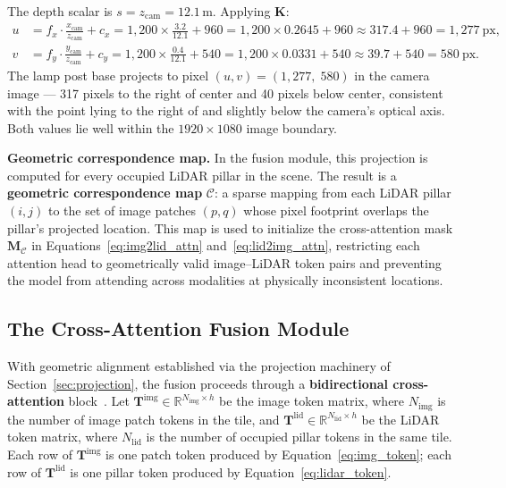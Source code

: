 \documentclass{book}
\begin{document}
The depth scalar is $s = z_{\text{cam}} = 12.1$\,m.  Applying
$\mathbf{K}$:
\begin{align*}
  u &= f_x \cdot \frac{x_{\text{cam}}}{z_{\text{cam}}} + c_x
     = 1{,}200 \times \frac{3.2}{12.1} + 960
     = 1{,}200 \times 0.2645 + 960
     \approx 317.4 + 960
     = 1{,}277\ \text{px}, \\[6pt]
  v &= f_y \cdot \frac{y_{\text{cam}}}{z_{\text{cam}}} + c_y
     = 1{,}200 \times \frac{0.4}{12.1} + 540
     = 1{,}200 \times 0.0331 + 540
     \approx 39.7 + 540
     = 580\ \text{px}.
\end{align*}
The lamp post base projects to pixel $(u, v) = (1{,}277,\; 580)$
in the camera image --- 317 pixels to the right of center and 40
pixels below center, consistent with the point lying to the right
of and slightly below the camera's optical axis.  Both values lie
well within the $1920 \times 1080$ image boundary.

\medskip
\noindent\textbf{Geometric correspondence map.}
In the fusion module, this projection is computed for every occupied
LiDAR pillar in the scene.  The result is a \textbf{geometric
correspondence map} $\mathcal{C}$: a sparse mapping from each LiDAR
pillar $(i,j)$ to the set of image patches $(p,q)$ whose pixel
footprint overlaps the pillar's projected location.  This map is
used to initialize the cross-attention mask $\mathbf{M}_{\mathcal{C}}$
in Equations~\eqref{eq:img2lid_attn} and~\eqref{eq:lid2img_attn},
restricting each attention head to geometrically valid
image--LiDAR token pairs and preventing the model from attending
across modalities at physically inconsistent locations.

 
\subsection{The Cross-Attention Fusion Module}
\label{sec:fusion}

With geometric alignment established via the projection machinery of
Section~\ref{sec:projection}, the fusion proceeds through a
\textbf{bidirectional cross-attention} block~\cite{chen2021crossvit,
li2022bevformer}.  Let
$\mathbf{T}^{\text{img}} \in \mathbb{R}^{N_{\text{img}} \times h}$
be the image token matrix, where $N_{\text{img}}$ is the number of
image patch tokens in the tile, and
$\mathbf{T}^{\text{lid}} \in \mathbb{R}^{N_{\text{lid}} \times h}$
be the LiDAR token matrix, where $N_{\text{lid}}$ is the number of
occupied pillar tokens in the same tile.  Each row of
$\mathbf{T}^{\text{img}}$ is one patch token produced by
Equation~\eqref{eq:img_token}; each row of $\mathbf{T}^{\text{lid}}$
is one pillar token produced by Equation~\eqref{eq:lidar_token}.
\end{document}
